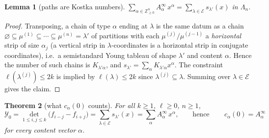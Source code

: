 \documentclass[11pt]{article}
\theoremstyle{plain}
\newtheorem{theorem}{Theorem}
\newtheorem{lemma}[theorem]{Lemma}
\theoremstyle{definition}
\newcommand{\Z}{\mathbb{Z}}
\newcommand{\Lam}{\Lambda_n}
\begin{document}
\begin{lemma}[paths are Kostka numbers]\label{lem:kostka}
$\displaystyle\sum_{\alpha\in\Z_{\ge0}^n}A^\infty_\alpha\,x^\alpha
  =\sum_{\lambda\in\mathcal E}s_{\lambda'}(x)$ in $\Lam$.
\end{lemma}

\begin{proof}
Transposing, a chain of type $\alpha$ ending at $\lambda$ is the same datum as a chain
$\varnothing\subseteq\mu^{(1)}\subseteq\cdots\subseteq\mu^{(n)}=\lambda'$ of partitions with
each $\mu^{(j)}/\mu^{(j-1)}$ a \emph{horizontal} strip of size $\alpha_j$ (a vertical strip
in $\lambda$-coordinates is a horizontal strip in conjugate coordinates), i.e.\ a
semistandard Young tableau of shape $\lambda'$ and content $\alpha$.  Hence the number of
such chains is $K_{\lambda'\alpha}$, and $s_{\lambda'}=\sum_\alpha K_{\lambda'\alpha}x^\alpha$.
The constraint $\ell(\lambda^{(j)})\le2k$ is implied by $\ell(\lambda)\le 2k$ since
$\lambda^{(j)}\subseteq\lambda$.  Summing over $\lambda\in\mathcal E$ gives the claim.
\end{proof}

\begin{theorem}[what $c_\alpha(0)$ counts]\label{thm:B}
For all $k\ge1$, $\ell\ge0$, $n\ge1$,
\[
  \mathcal Y_0=\det_{1\le i,j\le k}\bigl(f_{i-j}-f_{i+j}\bigr)
   =\sum_{\lambda\in\mathcal E}s_{\lambda'}(x)
   =\sum_{\alpha}A^\infty_\alpha\,x^\alpha,
  \qquad\text{hence}\qquad
  \boxed{\,c_\alpha(0)=A^\infty_\alpha\,}
\]
for every content vector $\alpha$.
\end{theorem}
\end{document}
